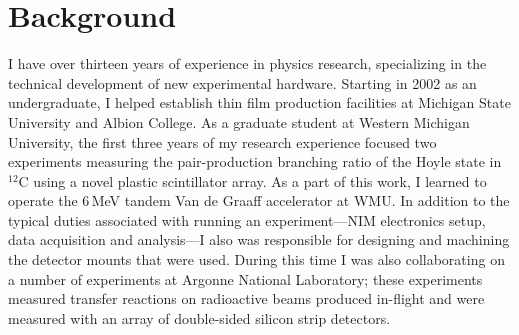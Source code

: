 \pagestyle{fancy}
\rhead{\desctext{\statename}}
{}
\section*{Background}

I have over thirteen years of experience in physics research, specializing in the technical development of new experimental hardware.
Starting in 2002 as an undergraduate, I helped establish thin film production facilities at Michigan State University and Albion College.
As a graduate student at Western Michigan University, the first three years of my research experience focused two experiments measuring the pair-production branching ratio of the Hoyle state in $^{12}$C using a novel plastic scintillator array.  As a part of this work, I learned to operate the 6\,MeV tandem Van de Graaff accelerator at WMU.  In addition to the typical duties associated with running an experiment---NIM electronics setup, data acquisition and analysis---I also was responsible for designing and machining the detector mounts that were used.  During this time I was also collaborating on a number of experiments at Argonne National Laboratory; these experiments measured transfer reactions on radioactive beams produced in-flight and were measured with an array of double-sided silicon strip detectors.

